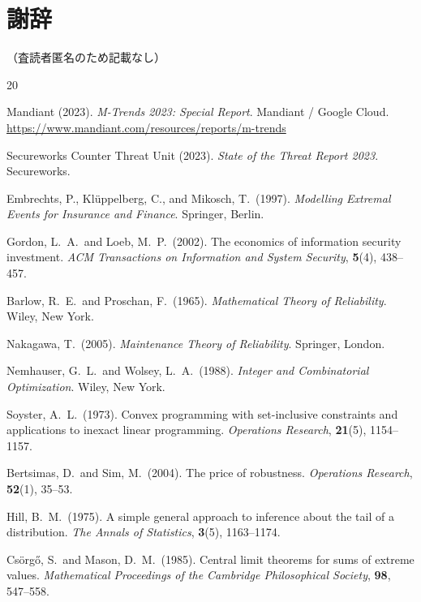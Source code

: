 \documentclass[12pt,a4paper]{article}
\theoremstyle{plain}
\theoremstyle{definition}
\theoremstyle{remark}
\begin{document}
\section*{謝辞}
（査読者匿名のため記載なし）

\begin{thebibliography}{20}

Mandiant (2023).
\textit{M-Trends 2023: Special Report}.
Mandiant / Google Cloud.
\url{https://www.mandiant.com/resources/reports/m-trends}

Secureworks Counter Threat Unit (2023).
\textit{State of the Threat Report 2023}.
Secureworks.

Embrechts, P., Kl\"{u}ppelberg, C., and Mikosch, T.\ (1997).
\textit{Modelling Extremal Events for Insurance and Finance}.
Springer, Berlin.

Gordon, L.\ A.\ and Loeb, M.\ P.\ (2002).
The economics of information security investment.
\textit{ACM Transactions on Information and System Security}, \textbf{5}(4), 438--457.

Barlow, R.\ E.\ and Proschan, F.\ (1965).
\textit{Mathematical Theory of Reliability}.
Wiley, New York.

Nakagawa, T.\ (2005).
\textit{Maintenance Theory of Reliability}.
Springer, London.

Nemhauser, G.\ L.\ and Wolsey, L.\ A.\ (1988).
\textit{Integer and Combinatorial Optimization}.
Wiley, New York.

Soyster, A.\ L.\ (1973).
Convex programming with set-inclusive constraints and applications to inexact linear programming.
\textit{Operations Research}, \textbf{21}(5), 1154--1157.

Bertsimas, D.\ and Sim, M.\ (2004).
The price of robustness.
\textit{Operations Research}, \textbf{52}(1), 35--53.

Hill, B.\ M.\ (1975).
A simple general approach to inference about the tail of a distribution.
\textit{The Annals of Statistics}, \textbf{3}(5), 1163--1174.

Cs\"{o}rg\H{o}, S.\ and Mason, D.\ M.\ (1985).
Central limit theorems for sums of extreme values.
\textit{Mathematical Proceedings of the Cambridge Philosophical Society},
\textbf{98}, 547--558.


\end{thebibliography}
\end{document}
